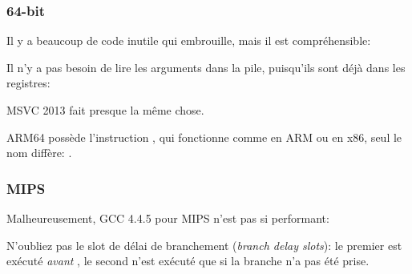 \subsubsection{64-bit}



Il y a beaucoup de code inutile qui embrouille, mais il est compréhensible:




Il n'y a pas besoin de lire les arguments dans la pile, puisqu'ils sont déjà dans
les registres:



MSVC 2013 fait presque la même chose.


ARM64 possède l'instruction , qui fonctionne comme  en ARM ou
 en x86, seul le nom diffère:
.



\subsubsection{MIPS}

Malheureusement, GCC 4.4.5 pour MIPS n'est pas si performant:



N'oubliez pas le slot de délai de branchement (\emph{branch delay slots}): le premier
 est exécuté \emph{avant} , le second  n'est exécuté
que si la branche n'a pas été prise.

